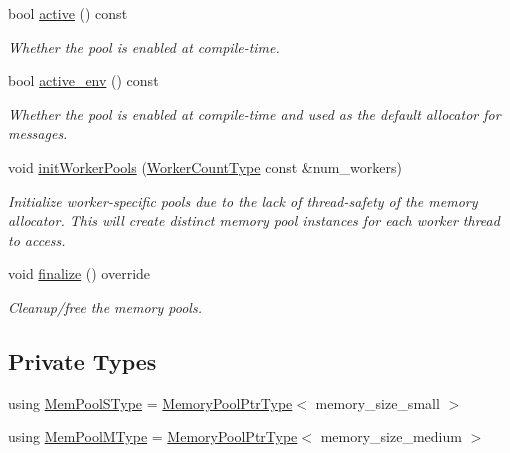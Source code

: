 \begin{DoxyCompactItemize}
bool \hyperlink{structvt_1_1pool_1_1_pool_a3f34112821d767815d5049dc83503033}{active} () const
\begin{DoxyCompactList}\small\item\em Whether the pool is enabled at compile-\/time. \end{DoxyCompactList}\item 
bool \hyperlink{structvt_1_1pool_1_1_pool_aa11bdd76d9f6491ac412d5abc5c63274}{active\+\_\+env} () const
\begin{DoxyCompactList}\small\item\em Whether the pool is enabled at compile-\/time and used as the default allocator for messages. \end{DoxyCompactList}\item 
void \hyperlink{structvt_1_1pool_1_1_pool_aeb8ad6a3ac3cf168dc4f2d2be2714edc}{init\+Worker\+Pools} (\hyperlink{namespacevt_aa93398ea48f2cb6c188512250f7cc248}{Worker\+Count\+Type} const \&num\+\_\+workers)
\begin{DoxyCompactList}\small\item\em Initialize worker-\/specific pools due to the lack of thread-\/safety of the memory allocator. This will create distinct memory pool instances for each worker thread to access. \end{DoxyCompactList}\item 
void \hyperlink{structvt_1_1pool_1_1_pool_a45a2880809625a77bb93c3dfcd9c7603}{finalize} () override
\begin{DoxyCompactList}\small\item\em Cleanup/free the memory pools. \end{DoxyCompactList}\end{DoxyCompactItemize}
\subsection*{Private Types}
\begin{DoxyCompactItemize}
\item 
using \hyperlink{structvt_1_1pool_1_1_pool_a9f94985824d12c43357cfe50eaaefd38}{Mem\+Pool\+S\+Type} = \hyperlink{structvt_1_1pool_1_1_pool_a21e20f5b56c3bae4f0d0cc36ed9c5eee}{Memory\+Pool\+Ptr\+Type}$<$ memory\+\_\+size\+\_\+small $>$
\item 
using \hyperlink{structvt_1_1pool_1_1_pool_a8a201b9a843e47cd4e7b568a8e4483da}{Mem\+Pool\+M\+Type} = \hyperlink{structvt_1_1pool_1_1_pool_a21e20f5b56c3bae4f0d0cc36ed9c5eee}{Memory\+Pool\+Ptr\+Type}$<$ memory\+\_\+size\+\_\+medium $>$
\end{DoxyCompactItemize}
